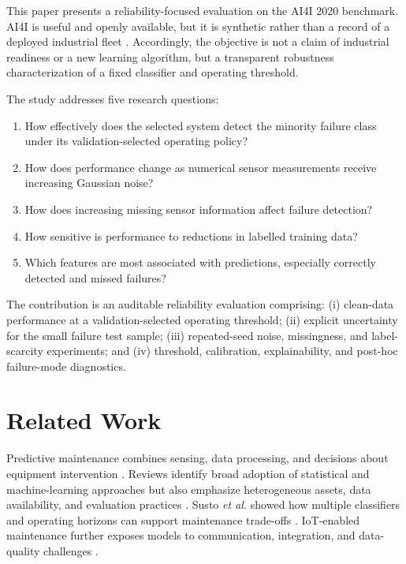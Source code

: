 \documentclass[conference]{IEEEtran}
\begin{document}
This paper presents a reliability-focused evaluation on the AI4I 2020 benchmark. AI4I is useful and openly available, but it is synthetic rather than a record of a deployed industrial fleet \cite{uci_ai4i,matzka2020xai}. Accordingly, the objective is not a claim of industrial readiness or a new learning algorithm, but a transparent robustness characterization of a fixed classifier and operating threshold.

The study addresses five research questions:
\begin{enumerate}
\item[RQ1:] How effectively does the selected system detect the minority failure class under its validation-selected operating policy?
\item[RQ2:] How does performance change as numerical sensor measurements receive increasing Gaussian noise?
\item[RQ3:] How does increasing missing sensor information affect failure detection?
\item[RQ4:] How sensitive is performance to reductions in labelled training data?
\item[RQ5:] Which features are most associated with predictions, especially correctly detected and missed failures?
\end{enumerate}

The contribution is an auditable reliability evaluation comprising: (i) clean-data performance at a validation-selected operating threshold; (ii) explicit uncertainty for the small failure test sample; (iii) repeated-seed noise, missingness, and label-scarcity experiments; and (iv) threshold, calibration, explainability, and post-hoc failure-mode diagnostics.

\section{Related Work}
Predictive maintenance combines sensing, data processing, and decisions about equipment intervention \cite{jardine2006review}. Reviews identify broad adoption of statistical and machine-learning approaches but also emphasize heterogeneous assets, data availability, and evaluation practices \cite{carvalho2019review,zonta2020review,dalzochio2020status}. Susto \emph{et al.} showed how multiple classifiers and operating horizons can support maintenance trade-offs \cite{susto2015pdm}. IoT-enabled maintenance further exposes models to communication, integration, and data-quality challenges \cite{compare2020iot}.
\end{document}
